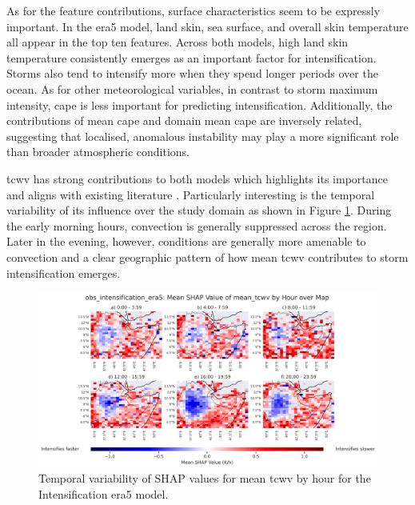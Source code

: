 As for the feature contributions, surface characteristics seem to be expressly important. In the \acrshort{era5} model, land skin, sea surface, and overall skin temperature all appear in the top ten features. Across both models, high land skin temperature consistently emerges as an important factor for intensification. Storms also tend to intensify more when they spend longer periods over the ocean. As for other meteorological variables, in contrast to storm maximum intensity, \acrshort{cape} is less important for predicting intensification. Additionally, the contributions of mean \acrshort{cape} and domain mean \acrshort{cape} are inversely related, suggesting that localised, anomalous instability may play a more significant role than broader atmospheric conditions.

\acrfull{tcwv} has strong contributions to both models which highlights its importance and aligns with existing literature \citep{Li2023,Muetzelfeldt2025,Klein2020}. Particularly interesting is the temporal variability of its influence over the study domain as shown in Figure \ref{fig:obs_intensification_era5_shap_mean_tcwv_map_by_hour}. During the early morning hours, convection is generally suppressed across the region. Later in the evening, however, conditions are generally more amenable to convection and a clear geographic pattern of how mean \acrshort{tcwv} contributes to storm intensification emerges. 

\begin{figure}[ht]
    \centering
    \includegraphics[width=\textwidth]{../figures/generated/experiments/obs_intensification/geographic_corr/obs_intensification_era5_shap_mean_tcwv_map_by_hour.png}
    \caption{Temporal variability of SHAP values for mean \acrshort{tcwv} by hour for the Intensification \acrshort{era5} model.}
    \label{fig:obs_intensification_era5_shap_mean_tcwv_map_by_hour}
\end{figure}


